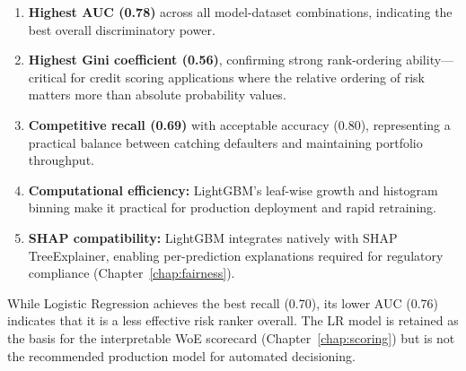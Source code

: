 \begin{enumerate}
    \item \textbf{Highest AUC (0.78)} across all model-dataset combinations, indicating the best overall discriminatory power.
    \item \textbf{Highest Gini coefficient (0.56)}, confirming strong rank-ordering ability---critical for credit scoring applications where the relative ordering of risk matters more than absolute probability values.
    \item \textbf{Competitive recall (0.69)} with acceptable accuracy (0.80), representing a practical balance between catching defaulters and maintaining portfolio throughput.
    \item \textbf{Computational efficiency:} LightGBM's leaf-wise growth and histogram binning make it practical for production deployment and rapid retraining.
    \item \textbf{SHAP compatibility:} LightGBM integrates natively with SHAP TreeExplainer, enabling per-prediction explanations required for regulatory compliance (Chapter~\ref{chap:fairness}).
\end{enumerate}

While Logistic Regression achieves the best recall (0.70), its lower AUC (0.76) indicates that it is a less effective risk ranker overall. The LR model is retained as the basis for the interpretable WoE scorecard (Chapter~\ref{chap:scoring}) but is not the recommended production model for automated decisioning.
